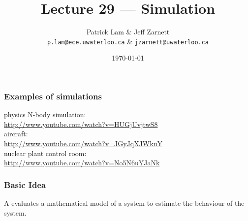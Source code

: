 
\usepackage{tikz-3dplot}

\title{Lecture 29 --- Simulation}

\author{Patrick Lam \& Jeff Zarnett \\ \small \texttt{p.lam@ece.uwaterloo.ca} \& \texttt{jzarnett@uwaterloo.ca}}
\date{\today}



\begin{frame}
  \titlepage
\end{frame}

\begin{frame}
\frametitle{Examples of simulations}

\begin{changemargin}{1cm}
physics N-body simulation:\\
\url{http://www.youtube.com/watch?v=HUGjUvjtwS8} \\[1em]

aircraft:\\
\url{http://www.youtube.com/watch?v=JGyJqXJWkuY} \\[1em]

nuclear plant control room:\\
\url{http://www.youtube.com/watch?v=No5N6uYJaNk} 
\end{changemargin}

\end{frame}

\begin{frame}
\frametitle{Basic Idea}

\begin{changemargin}{1cm}
\huge

A  evaluates a mathematical model of a system
to estimate the behaviour of the system.

\end{changemargin}

\end{frame}

